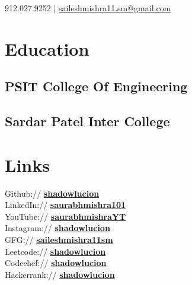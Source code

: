 \documentclass[]{deedy-resume-openfont}
\begin{document}
%
%

%
%
 {}{ 
 912.027.9252 | \href{mailto:saileshmishra11.sm@gmail.com}{saileshmishra11.sm@gmail.com}
}

%
%

\begin{minipage}[t]{0.33\textwidth} 


\section{Education} 


\subsection{PSIT College Of Engineering}
\sectionsep

\subsection{Sardar Patel Inter College}
\sectionsep


\section{Links} 
Github:// \href{https://github.com/shadowlucion}{\bf shadowlucion} \\
LinkedIn://  \href{https://www.linkedin.com/in/saurabhmishra101}{\bf saurabhmishra101} \\
YouTube://  \href{https://www.youtube.com/@saurabhmishraYT}{\bf saurabhmishraYT} \\
Instagram://  \href{https://www.instagram.com/shadowlucion}{\bf shadowlucion} \\
GFG://  \href{https://auth.geeksforgeeks.org/user/saileshmishra11sm}{\bf saileshmishra11sm} \\
Leetcode://  \href{https://leetcode.com/shadowlucion}{\bf shadowlucion} \\
Codechef://  \href{https://www.codechef.com/users/shadowlucion}{\bf shadowlucion} \\
Hackerrank://  \href{https://www.hackerrank.com/shadowlucion}{\bf shadowlucion} \\




\end{minipage}
\end{document}
